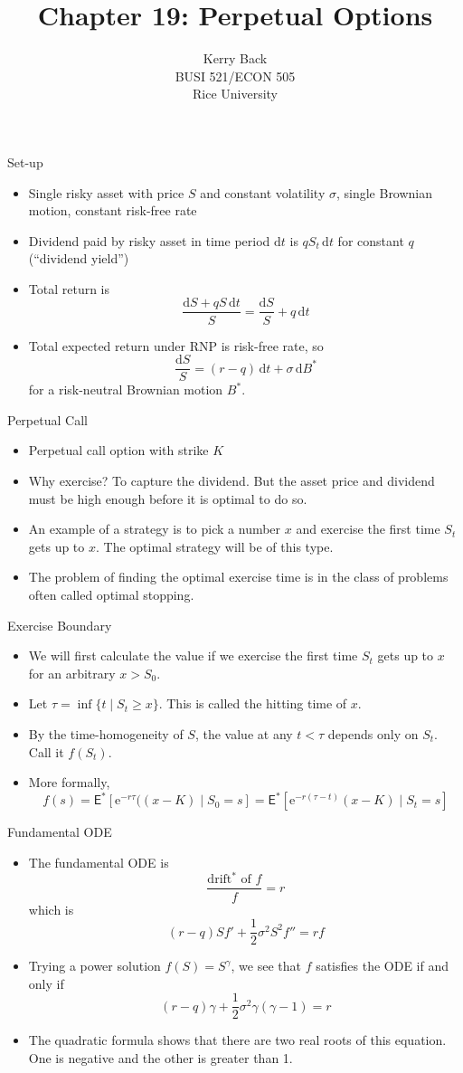 \documentclass[10pt]{beamer}
\title{Chapter 19: Perpetual Options}
\date{}
\author{Kerry Back\\ 
BUSI 521/ECON 505\\
Rice University}
\newcommand{\bi}{\begin{itemize}}
\newcommand{\ei}{\end{itemize}}
\newcommand{\im}{\item}
\newcommand{\D}{\mathrm{d}}
\newcommand{\E}{\mathrm{e}}
\newcommand{\mye}{\ensuremath{\mathsf{E}}}
\begin{document}
\maketitle


\begin{frame}{Set-up}
    \bi 
      \im Single risky asset with price $S$ and constant volatility $\sigma$, single Brownian motion, constant risk-free rate
    
      \im Dividend paid by risky asset in time period $\D t$ is $qS_t\,\D t$ for constant $q$ (``dividend yield'')
    
      \im Total return is
    $$\frac{\D S + qS\,\D t}{S} = \frac{\D S}{S} + q\,\D t$$
    \im Total expected return under RNP is risk-free rate, so
    $$\frac{\D S}{S} = (r-q)\,\D t + \sigma\,\D B^*$$
    for a risk-neutral Brownian motion $B^*$.
    \ei
 \end{frame}
 

 \begin{frame}{Perpetual Call} 
    \bi \im
 Perpetual call option with strike $K$
 
 \im Why exercise?  To capture the dividend.  But the asset price and dividend must be high enough before it is optimal to do so.
 
 \im An example of a strategy is to pick a number $x$ and exercise the first time $S_t$ gets up to $x$.  The optimal strategy will be of this type.
 
 \im The problem of finding the optimal exercise time is in the class of problems often called optimal stopping.
 \ei 
 \end{frame}
 
 \begin{frame}{Exercise Boundary}
    \bi \im
 We will first calculate the value if we exercise the first time $S_t$ gets up to $x$ for an arbitrary $x>S_0$.
 
 \im  Let $\tau = \inf\{t \mid S_t \ge x\}$.  This is called the hitting time of $x$.
 
 \im By the time-homogeneity of $S$, the value at any $t<\tau$ depends only on $S_t$.  Call it $f(S_t)$.  
     
 \im    More formally,
     $$f(s) = \mye^*[\E^{-r\tau}((x-K) \mid S_0=s] = \mye^*[\E^{-r(\tau-t)} (x-K)\mid S_t=s]$$
     \ei 
 \end{frame}
 \begin{frame}{Fundamental ODE}
     \bi \im 
     The fundamental ODE is 
     $$\frac{\text{drift$^*$ of $f$}}{f} = r$$
     which is
     $$(r-q)Sf' + \frac{1}{2}\sigma^2S^2f'' = rf$$
     \im Trying a power solution $f(S) = S^\gamma$, we see that $f$ satisfies the ODE if and only if
     $$(r-q)\gamma + \frac{1}{2}\sigma^2\gamma(\gamma-1) = r$$
     \im The quadratic formula shows that there are two real roots of this equation.  One is negative and the other is greater than 1.  
     \ei
     
 
 \end{frame}
     
\end{document}
